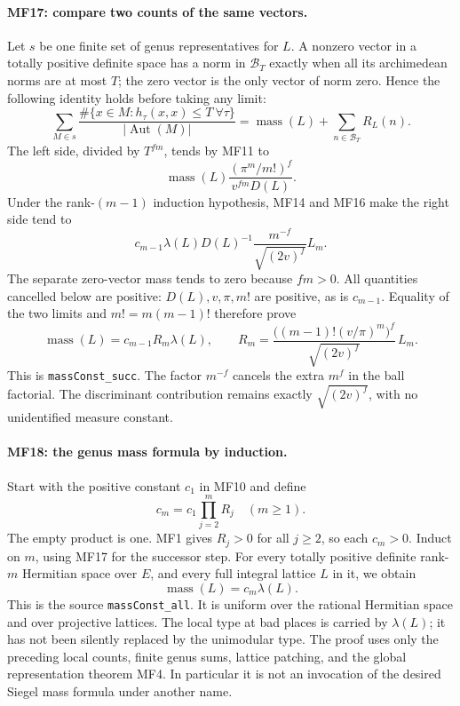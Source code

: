 \paragraph{MF17: compare two counts of the same vectors.}
Let \(s\) be one finite set of genus representatives for \(L\).
A nonzero vector in a totally positive definite space has a norm
in \(\mathcal B_T\) exactly when all its archimedean norms are
at most \(T\); the zero vector is the only vector of norm zero.
Hence the following identity holds before taking any limit:
\[
 \sum_{M\in s}\frac{\#\{x\in M:h_\tau(x,x)\le T\ \forall\tau\}}
                       {|\operatorname{Aut}(M)|}
              =\operatorname{mass}(L)+\sum_{n\in\mathcal B_T}R_L(n).
                                                               \tag{MF.39}
\]
The left side, divided by \(T^{fm}\), tends by MF11 to
\[
            \operatorname{mass}(L)
                        \frac{(\pi^m/m!)^f}{v^{fm}D(L)}.
\]
Under the rank-\((m-1)\) induction hypothesis, MF14 and MF16 make
the right side tend to
\[
            c_{m-1}\lambda(L)D(L)^{-1}
                             \frac{m^{-f}}{\sqrt{(2v)^f}}L_m.
\]
The separate zero-vector mass tends to zero because \(fm>0\).
All quantities cancelled below are positive: \(D(L),v,\pi,m!\)
are positive, as is \(c_{m-1}\).
Equality of the two limits and \(m!=m(m-1)!\) therefore prove
\[
 \operatorname{mass}(L)=c_{m-1}R_m\lambda(L),\qquad
 R_m=\frac{\big((m-1)!(v/\pi)^m\big)^f}{\sqrt{(2v)^f}}\,L_m .
                                                               \tag{MF.40}
\]
This is \texttt{massConst\_succ}.
The factor \(m^{-f}\) cancels the extra \(m^f\) in the ball
factorial. The discriminant contribution remains exactly
\(\sqrt{(2v)^f}\), with no unidentified measure constant.

\paragraph{MF18: the genus mass formula by induction.}
Start with the positive constant \(c_1\) in MF10 and define
\[
                   c_m=c_1\prod_{j=2}^m R_j
                   \quad(m\ge1).                    \tag{MF.41}
\]
The empty product is one. MF1 gives \(R_j>0\) for all \(j\ge2\),
so each \(c_m>0\).
Induct on \(m\), using MF17 for the successor step.
For every totally positive definite rank-\(m\) Hermitian space
over \(E\), and every full integral lattice \(L\) in it, we obtain
\[
                    \operatorname{mass}(L)=c_m\lambda(L).
                                                               \tag{MF.42}
\]
This is the source \texttt{massConst\_all}.
It is uniform over the rational Hermitian space and over
projective lattices. The local type at bad places is carried by
\(\lambda(L)\); it has not been silently replaced by the
unimodular type. The proof uses only the preceding local counts,
finite genus sums, lattice patching, and the global representation
theorem MF4. In particular it is not an invocation of the desired
Siegel mass formula under another name.

